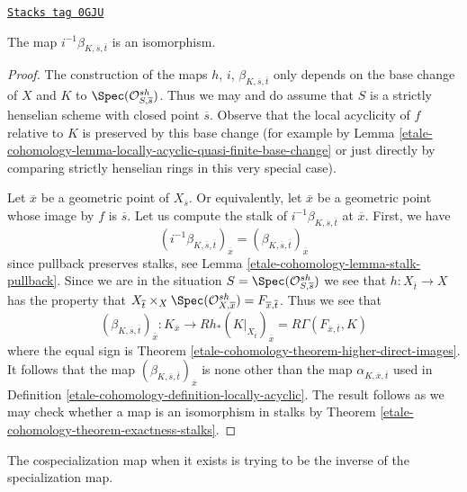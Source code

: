 \begin{lemma}
\label{etale-cohomology-lemma-beta-is-isomorphism}
\href{https://stacks.math.columbia.edu/tag/0GJU}{\texttt{Stacks tag 0GJU}}

The map $i^{-1}\beta_{K, \overline{s}, \overline{t}}$ is an isomorphism.
\end{lemma}

\begin{proof}
The construction of the maps $h$, $i$, $\beta_{K, \overline{s}, \overline{t}}$
only depends on the
base change of $X$ and $K$ to $\Spec(\mathcal{O}^{sh}_{S, \overline{s}})$.
Thus we may and do assume that $S$ is a strictly henselian scheme
with closed point $\overline{s}$. Observe that the local acyclicity
of $f$ relative to $K$ is preserved by this base change (for example
by Lemma \ref{etale-cohomology-lemma-locally-acyclic-quasi-finite-base-change} or just
directly by comparing strictly henselian rings in this very special case).

\medskip\noindent
Let $\overline{x}$ be a geometric point of $X_{\overline{s}}$.
Or equivalently, let $\overline{x}$ be a geometric point whose image
by $f$ is $\overline{s}$. Let us compute the stalk of
$i^{-1}\beta_{K, \overline{s}, \overline{t}}$
at $\overline{x}$. First, we have
$$
(i^{-1}\beta_{K, \overline{s}, \overline{t}})_{\overline{x}} =
(\beta_{K, \overline{s}, \overline{t}})_{\overline{x}}
$$
since pullback preserves stalks, see Lemma \ref{etale-cohomology-lemma-stalk-pullback}.
Since we are in the situation $S = \Spec(\mathcal{O}^{sh}_{S, \overline{s}})$
we see that $h : X_{\overline{t}} \to X$ has the property that
$X_{\overline{t}} \times_X \Spec(\mathcal{O}^{sh}_{X, \overline{x}})
= F_{\overline{x}, \overline{t}}$. Thus we see that
$$
(\beta_{K, \overline{s}, \overline{t}})_{\overline{x}} :
K_{\overline{x}}
\longrightarrow
Rh_*(K|_{X_{\overline{t}}})_{\overline{x}} =
R\Gamma(F_{\overline{x}, \overline{t}}, K)
$$
where the equal sign is Theorem \ref{etale-cohomology-theorem-higher-direct-images}.
It follows that the map $(\beta_{K, \overline{s}, \overline{t}})_{\overline{x}}$
is none other than the map $\alpha_{K, \overline{x}, \overline{t}}$ used
in Definition \ref{etale-cohomology-definition-locally-acyclic}. The result follows as we may
check whether a map is an isomorphism in stalks by
Theorem \ref{etale-cohomology-theorem-exactness-stalks}.
\end{proof}

The cospecialization map when it exists is trying to be the inverse
of the specialization map.

